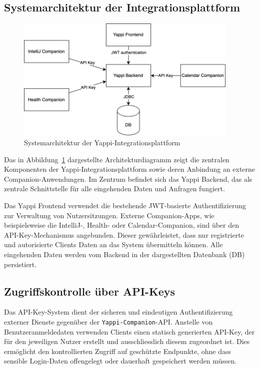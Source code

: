 \documentclass[12pt,a4paper]{report}
\begin{document}
\subsection{Systemarchitektur der Integrationsplattform}

\begin{figure}[!htbp]
  \centering
  \includegraphics[width=0.95\textwidth]{../figures/plattform-system-diagram.drawio.png}
  \caption{Systemarchitektur der Yappi-Integrationsplattform}
  \label{fig:systemarchitektur-integration-plattform}
\end{figure}

Das in Abbildung~\ref{fig:systemarchitektur-integration-plattform} dargestellte Architekturdiagramm zeigt die zentralen Komponenten der
Yappi-Integrationsplattform sowie deren Anbindung an externe Companion-Anwendungen. Im Zentrum befindet sich das Yappi Backend,
das als zentrale Schnittstelle für alle eingehenden Daten und Anfragen fungiert.

Das Yappi Frontend verwendet die bestehende JWT-basierte Authentifizierung zur Verwaltung von Nutzersitzungen. Externe
Companion-Apps, wie beispielsweise die IntelliJ-, Health- oder Calendar-Companion, sind über den API-Key-Mechanismus angebunden.
Dieser gewährleistet, dass nur registrierte und autorisierte Clients Daten an das System übermitteln können. Alle eingehenden
Daten werden vom Backend in der dargestellten Datenbank (DB) persistiert.

\subsection{Zugriffskontrolle über API-Keys}

Das API-Key-System dient der sicheren und eindeutigen Authentifizierung externer Dienste gegenüber der \texttt{Yappi-Companion}-API.
Anstelle von Benutzeranmeldedaten verwenden Clients einen statisch generierten API-Key, der für den jeweiligen Nutzer erstellt und ausschliesslich diesem zugeordnet ist.
Dies ermöglicht den kontrollierten Zugriff auf geschützte Endpunkte, ohne dass sensible Login-Daten offengelegt oder dauerhaft gespeichert werden müssen.
\end{document}
